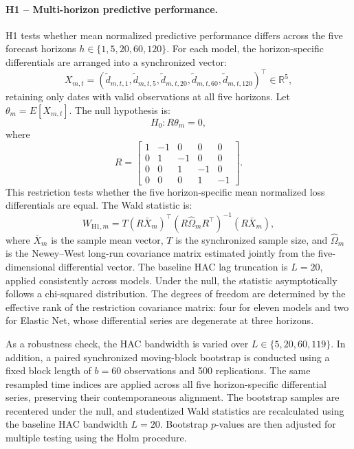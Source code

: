 \documentclass[12pt,twoside]{ord}
\begin{document}
\paragraph{H1 -- Multi-horizon predictive performance.} H1 tests whether mean normalized predictive performance differs across the five forecast horizons $h\in\{1,5,20,60,120\}$. For each model, the horizon-specific differentials are arranged into a synchronized vector:
\[
X_{m,t}
=
\left(
\widetilde d_{m,t,1},
\widetilde d_{m,t,5},
\widetilde d_{m,t,20},
\widetilde d_{m,t,60},
\widetilde d_{m,t,120}
\right)^\top
\in\mathbb{R}^5,
\]
retaining only dates with valid observations at all five horizons. Let $\theta_m=E[X_{m,t}]$. The null hypothesis is:
\begin{equation}
H_0:R\theta_m=0,
\end{equation}
where
\begin{equation}
R=
\begin{bmatrix}
1&-1&0&0&0\\
0&1&-1&0&0\\
0&0&1&-1&0\\
0&0&0&1&-1
\end{bmatrix}.
\end{equation}
This restriction tests whether the five horizon-specific mean normalized loss differentials are equal. The Wald statistic is:
\begin{equation}
W_{\mathrm{H1},m}
=
T(R\bar X_m)^\top
\left(R\widehat\Omega_mR^\top\right)^{-1}
(R\bar X_m),
\end{equation}
where $\bar X_m$ is the sample mean vector, $T$ is the synchronized sample size, and $\widehat\Omega_m$ is the Newey--West long-run covariance matrix estimated jointly from the five-dimensional differential vector. The baseline HAC lag truncation is $L=20$, applied consistently across models. Under the null, the statistic asymptotically follows a chi-squared distribution. The degrees of freedom are determined by the effective rank of the restriction covariance matrix: four for eleven models and two for Elastic Net, whose differential series are degenerate at three horizons.

As a robustness check, the HAC bandwidth is varied over $L\in\{5,20,60,119\}$. In addition, a paired synchronized moving-block bootstrap is conducted using a fixed block length of $b=60$ observations and 500 replications. The same resampled time indices are applied across all five horizon-specific differential series, preserving their contemporaneous alignment. The bootstrap samples are recentered under the null, and studentized Wald statistics are recalculated using the baseline HAC bandwidth $L=20$. Bootstrap $p$-values are then adjusted for multiple testing using the Holm procedure.
\end{document}
